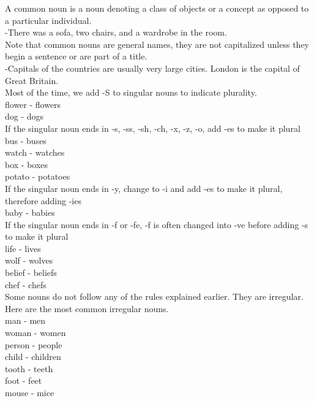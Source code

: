 \documentclass[12pt,a4paper]{article} %
\begin{document}
	A common noun is a noun denoting a class of objects or a concept as opposed to a particular individual.\\

		-There was a sofa, two chairs, and a wardrobe in the room.\\
		
	Note that common nouns are general names, they are not capitalized unless they begin a sentence or are part of a title.\\

		-Capitals of the countries are usually very large cities. London is the capital of Great Britain.\\
	
	Most of the time, we add -S to singular nouns to indicate plurality.\\
		
		flower - flowers\\
		dog - dogs\\
	
	If the singular noun ends in -s, -ss, -sh, -ch, -x, -z, -o, add -es to make it plural\\

		bus - buses\\
		watch - watches\\
		box - boxes\\
		potato - potatoes\\
	
	If the singular noun ends in -y, change to -i and add -es to make it plural, therefore adding -ies\\
	
		baby - babies\\
	
	If the singular noun ends in -f or -fe, -f is often changed into -ve before adding -s to make it plural\\

		life - lives\\
		wolf - wolves\\
		belief - beliefs\\
		chef - chefs\\
		
	Some nouns do not follow any of the rules explained earlier. They are irregular. Here are the most common irregular nouns.\\

		man - men\\
		woman - women\\
		person - people\\
		child - children\\
		tooth - teeth\\
		foot - feet\\
		mouse - mice\\
\end{document}
